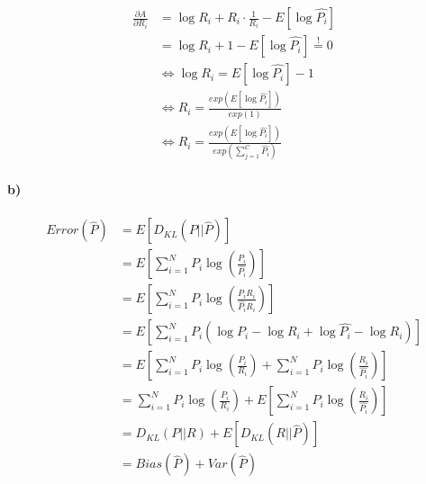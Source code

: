 \documentclass[12pt]{article}
\newcommand{\myexp}[1]{E\left[#1\right]}
\newcommand{\kbd}[2]{D_{KL}(#1||#2)}
\newcommand{\mysum}{\sum_{i=1}^N}
\begin{document}
\begin{equation}
\begin{split}
\frac{\partial A}{\partial R_i}
&= \log R_i + R_i \cdot \frac{1}{R_i} - \myexp{\log \hat{P_i}}\\
&= \log R_i + 1 - \myexp{\log \hat{P_i}} \stackrel{!}{=} 0\\
&\Leftrightarrow \log R_i = \myexp{\log \hat{P_i}} - 1\\
&\Leftrightarrow R_i = \frac{exp(\myexp{\log \hat{P_i}})}{exp(1)}\\
&\Leftrightarrow R_i = \frac{exp(\myexp{\log \hat{P_i}})}
                            {exp(\sum_{j=1}^C \hat{P_i})}
\end{split}
\end{equation}

\paragraph{b)}
\begin{equation}
\begin{split}
Error\left(\hat{P}\right)
&= \myexp{\kbd{P}{\hat{P}}}\\
&= \myexp{\mysum P_i \log\left(\frac{P_i}{\hat{P_i}}\right)}\\
&= \myexp{\mysum P_i \log\left(\frac{P_iR_i}{\hat{P_i}R_i}\right)}\\
&= \myexp{\mysum P_i\left(\log P_i-\log R_i + \log \hat{P_i} - \log R_i\right)}\\
&= \myexp{\mysum P_i \log\left(\frac{P_i}{R_i}\right) +
   \mysum P_i \log\left(\frac{R_i}{\hat{P_i}}\right)}\\
&= \mysum P_i \log\left(\frac{P_i}{R_i}\right) +
   \myexp{\mysum P_i \log\left(\frac{R_i}{\hat{P_i}}\right)}\\
&= \kbd{P}{R} + \myexp{\kbd{R}{\hat{P}}}\\
&= Bias\left(\hat{P}\right) + Var\left(\hat{P}\right)
\end{split}
\end{equation}
\end{document}
